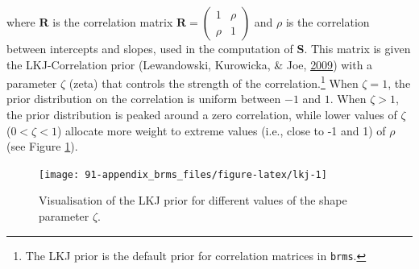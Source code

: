 \documentclass[a4paper,12pt,twoside,onecolumn,openright,final,oldfontcommands]{memoir}
\let\rmarkdownfootnote\footnote%
\def\footnote{\protect\rmarkdownfootnote}
\begin{document}
\vspace{5mm}

where \(\textbf{R}\) is the correlation matrix \(\textbf{R} = \begin{pmatrix} 1 & \rho \\ \rho & 1 \end{pmatrix}\) and \(\rho\) is the correlation between intercepts and slopes, used in the computation of \(\textbf{S}\). This matrix is given the LKJ-Correlation prior (Lewandowski, Kurowicka, \& Joe, \protect\hyperlink{ref-lewandowski_generating_2009}{2009}) with a parameter \(\zeta\) (zeta) that controls the strength of the correlation.\footnote{The LKJ prior is the default prior for correlation matrices in \texttt{brms}.} When \(\zeta = 1\), the prior distribution on the correlation is uniform between \(-1\) and \(1\). When \(\zeta > 1\), the prior distribution is peaked around a zero correlation, while lower values of \(\zeta\) (\(0 < \zeta < 1\)) allocate more weight to extreme values (i.e., close to -1 and 1) of \(\rho\) (see Figure \ref{fig:lkj}).

\begin{figure}[H]

{\centering \texttt{[image: 91-appendix\_brms\_files/figure-latex/lkj-1]} 

}

\caption{Visualisation of the LKJ prior for different values of the shape parameter $\zeta$.}\label{fig:lkj}
\end{figure}
\end{document}
